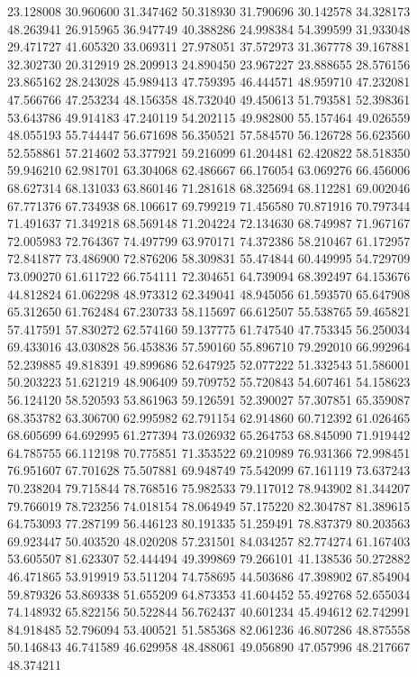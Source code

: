 23.128008
30.960600
31.347462
50.318930
31.790696
30.142578
34.328173
48.263941
26.915965
36.947749
40.388286
24.998384
54.399599
31.933048
29.471727
41.605320
33.069311
27.978051
37.572973
31.367778
39.167881
32.302730
20.312919
28.209913
24.890450
23.967227
23.888655
28.576156
23.865162
28.243028
45.989413
47.759395
46.444571
48.959710
47.232081
47.566766
47.253234
48.156358
48.732040
49.450613
51.793581
52.398361
53.643786
49.914183
47.240119
54.202115
49.982800
55.157464
49.026559
48.055193
55.744447
56.671698
56.350521
57.584570
56.126728
56.623560
52.558861
57.214602
53.377921
59.216099
61.204481
62.420822
58.518350
59.946210
62.981701
63.304068
62.486667
66.176054
63.069276
66.456006
68.627314
68.131033
63.860146
71.281618
68.325694
68.112281
69.002046
67.771376
67.734938
68.106617
69.799219
71.456580
70.871916
70.797344
71.491637
71.349218
68.569148
71.204224
72.134630
68.749987
71.967167
72.005983
72.764367
74.497799
63.970171
74.372386
58.210467
61.172957
72.841877
73.486900
72.876206
58.309831
55.474844
60.449995
54.729709
73.090270
61.611722
66.754111
72.304651
64.739094
68.392497
64.153676
44.812824
61.062298
48.973312
62.349041
48.945056
61.593570
65.647908
65.312650
61.762484
67.230733
58.115697
66.612507
55.538765
59.465821
57.417591
57.830272
62.574160
59.137775
61.747540
47.753345
56.250034
69.433016
43.030828
56.453836
57.590160
55.896710
79.292010
66.992964
52.239885
49.818391
49.899686
52.647925
52.077222
51.332543
51.586001
50.203223
51.621219
48.906409
59.709752
55.720843
54.607461
54.158623
56.124120
58.520593
53.861963
59.126591
52.390027
57.307851
65.359087
68.353782
63.306700
62.995982
62.791154
62.914860
60.712392
61.026465
68.605699
64.692995
61.277394
73.026932
65.264753
68.845090
71.919442
64.785755
66.112198
70.775851
71.353522
69.210989
76.931366
72.998451
76.951607
67.701628
75.507881
69.948749
75.542099
67.161119
73.637243
70.238204
79.715844
78.768516
75.982533
79.117012
78.943902
81.344207
79.766019
78.723256
74.018154
78.064949
57.175220
82.304787
81.389615
64.753093
77.287199
56.446123
80.191335
51.259491
78.837379
80.203563
69.923447
50.403520
48.020208
57.231501
84.034257
82.774274
61.167403
53.605507
81.623307
52.444494
49.399869
79.266101
41.138536
50.272882
46.471865
53.919919
53.511204
74.758695
44.503686
47.398902
67.854904
59.879326
53.869338
51.655209
64.873353
41.604452
55.492768
52.655034
74.148932
65.822156
50.522844
56.762437
40.601234
45.494612
62.742991
84.918485
52.796094
53.400521
51.585368
82.061236
46.807286
48.875558
50.146843
46.741589
46.629958
48.488061
49.056890
47.057996
48.217667
48.374211

